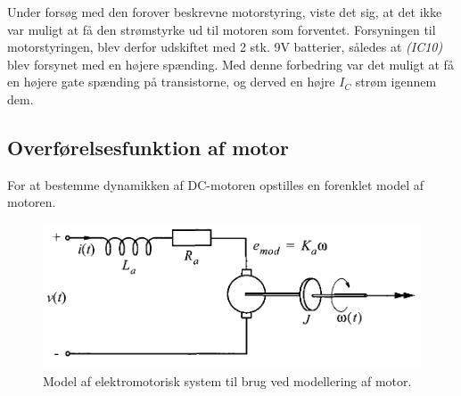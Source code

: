 Under forsøg med den forover beskrevne motorstyring, viste det sig, at det ikke var muligt at få den strømstyrke ud til motoren som forventet.
Forsyningen til motorstyringen, blev derfor udskiftet med 2 stk. 9V batterier, således at \emph{(IC10)} blev forsynet med en højere spænding.
Med denne forbedring var det muligt at få en højere gate spænding på transistorne, og derved en højre $I_C$ strøm igennem dem.
 
\subsection{Overførelsesfunktion af motor}
For at bestemme dynamikken af DC-motoren opstilles en forenklet model af motoren.

\begin{figure}[h!]
	\centering
	\includegraphics[width=.6\textwidth]{billeder/motor_model.png}
	\caption[Model af elektromotorisk system til brug ved modellering af motor]{Model af elektromotorisk system til brug ved modellering af motor\protect\footnotemark.}
	\label{fig:motor_model}
\end{figure}
\FloatBlock
{}

